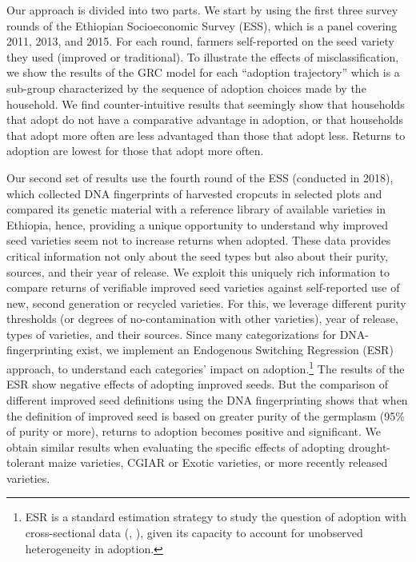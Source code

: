 \documentclass[11pt]{article}
\begin{document}
Our approach is divided into two parts. We start by using the first three survey rounds of the Ethiopian Socioeconomic Survey (ESS), which is a panel  covering  2011, 2013, and 2015. For each round, farmers self-reported on the seed variety they used (improved or traditional). To illustrate the effects of misclassification, we show the results of the GRC model for each ``adoption trajectory'' which is a sub-group characterized by the sequence of adoption choices made by the household. We find counter-intuitive results that seemingly show that households that adopt do not have a comparative advantage in adoption, or that households that adopt more often are less advantaged than those that adopt less. Returns to adoption are lowest for those that adopt more often.

Our second set of results use the fourth round of the ESS (conducted in 2018), which collected DNA fingerprints of harvested cropcuts in selected plots and compared its genetic material with a reference library of available varieties in Ethiopia, hence, providing a unique opportunity to understand why improved seed varieties seem not to increase returns when adopted. These data provides critical information not only about the seed types but also about their purity, sources, and their year of release. We exploit this uniquely rich information to compare returns of verifiable improved seed varieties against self-reported use of new, second generation or recycled varieties. For this, we leverage different purity thresholds (or degrees of no-contamination with other varieties), year of release, types of varieties, and their sources. Since many categorizations for DNA-fingerprinting exist, we implement an Endogenous Switching Regression (ESR) approach, to understand each categories' impact on adoption.\footnote{ESR is a standard estimation strategy to study the question of adoption with cross-sectional data (\citealt{Marenya2020-kb}, \citealt{Shiferaw2014-op}), given its capacity to account for unobserved heterogeneity in adoption.} The results of the ESR show negative effects of adopting improved seeds. But the comparison of different improved seed definitions using the DNA fingerprinting shows that when the definition of improved seed is based on greater purity of the germplasm (95\% of purity or more), returns to adoption becomes positive and significant. We obtain similar results when evaluating the specific effects of adopting drought-tolerant maize varieties, CGIAR or Exotic varieties, or more recently released varieties. 
\end{document}
